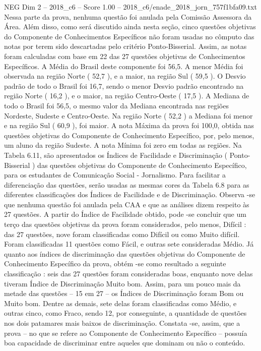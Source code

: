\begin{textsample}{NEG Dim 2 – 2018\_c6 – Score 1.00 – 2018\_c6/enade\_2018\_jorn\_757f1bfa09.txt}
Nessa parte da prova, nenhuma questão foi anulada pela Comissão Assessora da Área.
Além disso, como será discutido ainda nesta seção, cinco questões objetivas do Componente de Conhecimentos Específicos não foram usadas no cômputo das notas por terem sido descartadas pelo critério Ponto-Bisserial.
Assim, as notas foram calculadas com base em 22 das 27 questões objetivas de Conhecimentos Específicos.
A Média do Brasil deste componente foi 56,5.
A menor Média foi observada na região Norte ( 52,7 ), e a maior, na região Sul ( 59,5 ).
O Desvio padrão de todo o Brasil foi 16,7, sendo o menor Desvio padrão encontrado na região Norte ( 16,2 ), e o maior, na região Centro-Oeste ( 17,5 ).
A Mediana de todo o Brasil foi 56,5, o mesmo valor da Mediana encontrada nas regiões Nordeste, Sudeste e Centro-Oeste.
Na região Norte ( 52,2 ) a Mediana foi menor e na região Sul ( 60,9 ), foi maior.
A nota Máxima da prova foi 100,0, obtida nas questões objetivas do Componente de Conhecimento Específico, por, pelo menos, um aluno da região Sudeste.
A nota Mínima foi zero em todas as regiões.
Na Tabela 6.11, são apresentados os Índices de Facilidade e Discriminação ( Ponto-Bisserial ) das questões objetivas do Componente de Conhecimento Específico, para os estudantes de Comunicação Social - Jornalismo.
Para facilitar a diferenciação das questões, serão usadas as mesmas cores da Tabela 6.8 para as diferentes classificações dos Índices de Facilidade e de Discriminação.
Observa -se que nenhuma questão foi anulada pela CAA e que as análises dizem respeito às 27 questões.
A partir do Índice de Facilidade obtido, pode -se concluir que um terço das questões objetivas da prova foram considerados, pelo menos, Difícil : das 27 questões, nove foram classificadas como Difícil ou como Muito difícil.
Foram classificadas 11 questões como Fácil, e outras sete consideradas Médio.
Já quanto aos índices de discriminação das questões objetivas do Componente de Conhecimento Específico da prova, obtém -se como resultado a seguinte classificação : seis das 27 questões foram consideradas boas, enquanto nove delas tiveram Índice de Discriminação Muito bom.
Assim, para um pouco mais da metade das questões – 15 em 27 – os Índices de Discriminação foram Bom ou Muito bom.
Dentre as demais, sete delas foram classificadas como Médio, e outras cinco, como Fraco, sendo 12, por conseguinte, a quantidade de questões nos dois patamares mais baixos de discriminação.
Constata -se, assim, que a prova – no que se refere ao Componente de Conhecimento Específico – possuía boa capacidade de discriminar entre aqueles que dominam ou não o conteúdo.

\end{textsample}
